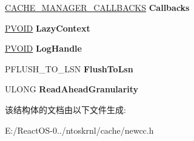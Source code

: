 \begin{DoxyCompactItemize}
\hyperlink{struct___c_a_c_h_e___m_a_n_a_g_e_r___c_a_l_l_b_a_c_k_s}{C\+A\+C\+H\+E\+\_\+\+M\+A\+N\+A\+G\+E\+R\+\_\+\+C\+A\+L\+L\+B\+A\+C\+KS} {\bfseries Callbacks}
\item 
\mbox{\label{struct___n_o_c_c___c_a_c_h_e___m_a_p_a629efaa1ff4f0ee1ac56563e3b3948bd}} 
\hyperlink{interfacevoid}{P\+V\+O\+ID} {\bfseries Lazy\+Context}
\item 
\mbox{\label{struct___n_o_c_c___c_a_c_h_e___m_a_p_a335a276d7860d7fbf35cfbfb74301600}} 
\hyperlink{interfacevoid}{P\+V\+O\+ID} {\bfseries Log\+Handle}
\item 
\mbox{\label{struct___n_o_c_c___c_a_c_h_e___m_a_p_ae3ba39986dc0089951822fbe571f6087}} 
P\+F\+L\+U\+S\+H\+\_\+\+T\+O\+\_\+\+L\+SN {\bfseries Flush\+To\+Lsn}
\item 
\mbox{\label{struct___n_o_c_c___c_a_c_h_e___m_a_p_a7861580751be973f21d4218a93484e6b}} 
U\+L\+O\+NG {\bfseries Read\+Ahead\+Granularity}
\end{DoxyCompactItemize}


该结构体的文档由以下文件生成\+:\begin{DoxyCompactItemize}
\item 
E\+:/\+React\+O\+S-\/0../ntoskrnl/cache/newcc.\+h\end{DoxyCompactItemize}
